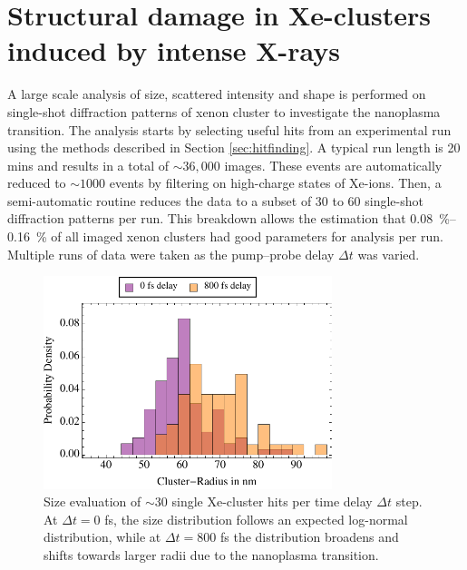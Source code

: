 \section{Structural damage in Xe-clusters induced by intense X-rays}\label{sec:xenon-data}
A large scale analysis of size, scattered intensity and shape is performed on single-shot diffraction patterns of xenon cluster to investigate the nanoplasma transition. The analysis starts by selecting useful hits from an experimental run using the methods described in Section \ref{sec:hitfinding}. A typical run length is 20 mins and results in a total of $\sim 36,000$ images. These events are automatically reduced to $\sim 1000$ events by filtering on high-charge states of Xe-ions. Then, a semi-automatic routine reduces the data to a subset of 30 to 60 single-shot diffraction patterns per run. This breakdown allows the estimation that \SIrange{0.08}{0.16}{\percent} of all imaged xenon clusters had good parameters for analysis per run. Multiple runs of data were taken as the pump--probe delay $\Delta t$ was varied.\\[1\baselineskip]
\begin{figure}
	\centering
		\includegraphics[width=0.75\textwidth]{images/size-distributions.pdf}
	\caption[Single Xe-cluster size distribution at varying time delay $\Delta t$.]{Size evaluation of $\sim 30$ single Xe-cluster hits per time delay $\Delta t$ step. At $\Delta t=0$ fs, the size distribution follows an expected log-normal distribution, while at $\Delta t=800$ fs the distribution broadens and shifts towards larger radii due to the nanoplasma transition.}
	\label{fig:size-distributions}
\end{figure}
